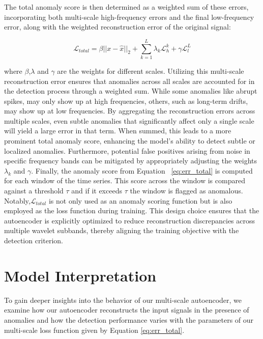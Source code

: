 The total anomaly score is then determined as a weighted sum of these errors, incorporating both multi-scale
high-frequency errors and the final low-frequency error, along with the weighted reconstruction error of the original
signal:

\begin{equation}
    \mathcal{L}_{total} = \beta||x-\hat{x}||_2+ \sum_{k=1}^{L}\lambda_k \mathcal{L}_h^k + \gamma\mathcal{L}_l^L
    \label{eq:err_total}
\end{equation}

where $\beta$,$\lambda$ and $\gamma$ are the weights for different scales.  Utilizing this multi-scale reconstruction
error ensures that anomalies across all scales are accounted for in the detection process through a weighted sum. While
some anomalies like abrupt spikes, may only show up at high frequencies, others, such as long-term drifts, may show up
at low frequencies. By aggregating the reconstruction errors across multiple scales, even subtle anomalies that significantly affect only a single scale will yield a large error in that term. When summed, this leads to a more prominent total anomaly score, enhancing the model’s ability to detect subtle or localized anomalies. Furthermore, potential false positives arising from noise in specific frequency bands can be mitigated by appropriately adjusting the weights $\lambda_k$ and $\gamma$.
Finally, the anomaly score from Equation
~\eqref{eq:err_total} is computed for each window of the time series. This score across the window is compared against a
threshold $\tau$ and if it exceeds $\tau$ the window is flagged as anomalous. Notably,$ \mathcal{L}_{total} $ is not only used as an anomaly scoring function but is also employed as the loss function during training. This design choice ensures that the autoencoder is explicitly optimized to reduce reconstruction discrepancies across multiple wavelet subbands, thereby aligning the training objective with the detection criterion.





\section{Model Interpretation}
\label{sec:interpretation}
To gain deeper insights into the behavior of our multi-scale autoencoder, we examine \one how our autoencoder reconstructs the input signals in the presence of anomalies and \two how the detection performance varies with the parameters of our multi-scale loss function given by Equation \eqref{eq:err_total}. 

